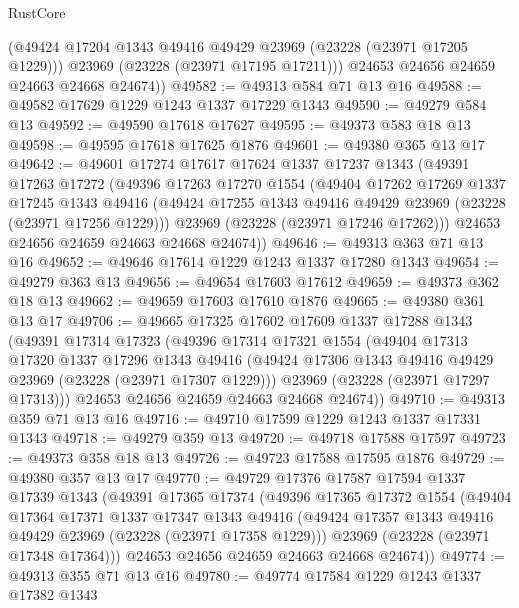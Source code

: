 \begin{lexlean}{RustCore}
\begin{coremodule}
          (@49424 @17204 @1343 @49416 @49429 @23969 (@23228 (@23971 @17205 @1229)))
          @23969
          (@23228 (@23971 @17195 @17211)))
        @24653
        @24656
        @24659
        @24663
        @24668
        @24674))
@49582 := @49313 @584 @71 @13 @16
@49588 := @49582 @17629 @1229 @1243 @1337 @17229 @1343
@49590 := @49279 @584 @13
@49592 := @49590 @17618 @17627
@49595 := @49373 @583 @18 @13
@49598 := @49595 @17618 @17625 @1876
@49601 := @49380 @365 @13 @17
@49642 := @49601
    @17274
    @17617
    @17624
    @1337
    @17237
    @1343
    (@49391
      @17263
      @17272
      (@49396
        @17263
        @17270
        @1554
        (@49404
          @17262
          @17269
          @1337
          @17245
          @1343
          @49416
          (@49424 @17255 @1343 @49416 @49429 @23969 (@23228 (@23971 @17256 @1229)))
          @23969
          (@23228 (@23971 @17246 @17262)))
        @24653
        @24656
        @24659
        @24663
        @24668
        @24674))
@49646 := @49313 @363 @71 @13 @16
@49652 := @49646 @17614 @1229 @1243 @1337 @17280 @1343
@49654 := @49279 @363 @13
@49656 := @49654 @17603 @17612
@49659 := @49373 @362 @18 @13
@49662 := @49659 @17603 @17610 @1876
@49665 := @49380 @361 @13 @17
@49706 := @49665
    @17325
    @17602
    @17609
    @1337
    @17288
    @1343
    (@49391
      @17314
      @17323
      (@49396
        @17314
        @17321
        @1554
        (@49404
          @17313
          @17320
          @1337
          @17296
          @1343
          @49416
          (@49424 @17306 @1343 @49416 @49429 @23969 (@23228 (@23971 @17307 @1229)))
          @23969
          (@23228 (@23971 @17297 @17313)))
        @24653
        @24656
        @24659
        @24663
        @24668
        @24674))
@49710 := @49313 @359 @71 @13 @16
@49716 := @49710 @17599 @1229 @1243 @1337 @17331 @1343
@49718 := @49279 @359 @13
@49720 := @49718 @17588 @17597
@49723 := @49373 @358 @18 @13
@49726 := @49723 @17588 @17595 @1876
@49729 := @49380 @357 @13 @17
@49770 := @49729
    @17376
    @17587
    @17594
    @1337
    @17339
    @1343
    (@49391
      @17365
      @17374
      (@49396
        @17365
        @17372
        @1554
        (@49404
          @17364
          @17371
          @1337
          @17347
          @1343
          @49416
          (@49424 @17357 @1343 @49416 @49429 @23969 (@23228 (@23971 @17358 @1229)))
          @23969
          (@23228 (@23971 @17348 @17364)))
        @24653
        @24656
        @24659
        @24663
        @24668
        @24674))
@49774 := @49313 @355 @71 @13 @16
@49780 := @49774 @17584 @1229 @1243 @1337 @17382 @1343

\end{coremodule}
\end{lexlean}
